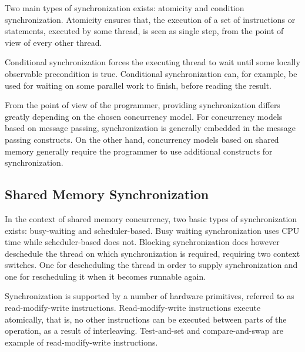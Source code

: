 Two main types of synchronization exists: atomicity and condition synchronization. Atomicity ensures that, the execution of a set of instructions or statements, executed by some thread, is seen as single step, from the point of view of every other thread\cite[p. 1989]{scott2011sync}.

Conditional synchronization forces the executing thread to wait until some locally observable precondition is true\cite[p. 1989]{scott2011sync}. Conditional synchronization can, for example, be used for waiting on some parallel work to finish, before reading the result.

From the point of view of the programmer, providing synchronization differs greatly depending on the chosen concurrency model. For concurrency models based on message passing, synchronization is generally embedded in the message passing constructs. On the other hand, concurrency models based on shared memory generally require the programmer to use additional constructs for synchronization\cite[p. 1989]{scott2011sync}.

\subsection{Shared Memory Synchronization}
In the context of shared memory concurrency, two basic types of synchronization exists: busy-waiting and scheduler-based\cite[p. 1990]{scott2011sync}. Busy waiting synchronization uses \ac{CPU} time while scheduler-based does not. Blocking synchronization does however deschedule the thread on which synchronization is required, requiring two context switches. One for descheduling the thread in order to supply synchronization and one for rescheduling it when it becomes runnable again.

Synchronization is supported by a number of hardware primitives, referred to as read-modify-write instructions\cite[p. 1990]{scott2011sync}. Read-modify-write instructions execute atomically, that is, no other instructions can be executed between parts of the operation, as a result of interleaving. Test-and-set and compare-and-swap are example of read-modify-write instructions.  

\worksheetend
